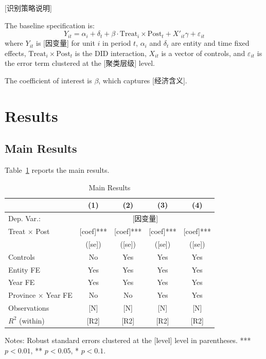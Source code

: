 \documentclass[12pt,a4paper]{article}
\begin{document}
[识别策略说明]

The baseline specification is:
\begin{equation}\label{eq:did}
Y_{it} = \alpha_i + \delta_t + \beta \cdot \text{Treat}_i \times \text{Post}_t + X'_{it}\gamma + \varepsilon_{it}
\end{equation}
where $Y_{it}$ is [因变量] for unit $i$ in period $t$, $\alpha_i$ and $\delta_t$ are entity and time fixed effects, $\text{Treat}_i \times \text{Post}_t$ is the DID interaction, $X_{it}$ is a vector of controls, and $\varepsilon_{it}$ is the error term clustered at the [聚类层级] level.

The coefficient of interest is $\beta$, which captures [经济含义].


\section{Results}\label{sec:results}

\subsection{Main Results}

Table~\ref{tab:main} reports the main results.

\begin{table}[H]
\centering
\caption{Main Results}\label{tab:main}
\begin{threeparttable}
\begin{tabular}{lcccc}
\toprule
 & (1) & (2) & (3) & (4) \\
\midrule
Dep. Var.: & \multicolumn{4}{c}{[因变量]} \\
\midrule
Treat $\times$ Post & [coef]*** & [coef]*** & [coef]*** & [coef]*** \\
 & ([se]) & ([se]) & ([se]) & ([se]) \\
\midrule
Controls & No & Yes & Yes & Yes \\
Entity FE & Yes & Yes & Yes & Yes \\
Year FE & Yes & Yes & Yes & Yes \\
Province $\times$ Year FE & No & No & Yes & Yes \\
\midrule
Observations & [N] & [N] & [N] & [N] \\
$R^2$ (within) & [R2] & [R2] & [R2] & [R2] \\
\bottomrule
\end{tabular}
\begin{tablenotes}[flushleft]
\small
\item Notes: Robust standard errors clustered at the [level] level in parentheses. *** $p<0.01$, ** $p<0.05$, * $p<0.1$.
\end{tablenotes}
\end{threeparttable}
\end{table}
\end{document}
